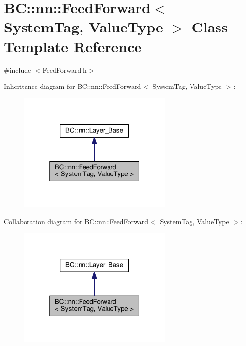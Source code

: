 \hypertarget{classBC_1_1nn_1_1FeedForward}{}\section{BC\+:\+:nn\+:\+:Feed\+Forward$<$ System\+Tag, Value\+Type $>$ Class Template Reference}
\label{classBC_1_1nn_1_1FeedForward}


{\ttfamily \#include $<$Feed\+Forward.\+h$>$}



Inheritance diagram for BC\+:\+:nn\+:\+:Feed\+Forward$<$ System\+Tag, Value\+Type $>$\+:
\nopagebreak
\begin{figure}[H]
\begin{center}
\leavevmode
\includegraphics[width=217pt]{classBC_1_1nn_1_1FeedForward__inherit__graph}
\end{center}
\end{figure}


Collaboration diagram for BC\+:\+:nn\+:\+:Feed\+Forward$<$ System\+Tag, Value\+Type $>$\+:
\nopagebreak
\begin{figure}[H]
\begin{center}
\leavevmode
\includegraphics[width=217pt]{classBC_1_1nn_1_1FeedForward__coll__graph}
\end{center}
\end{figure}
